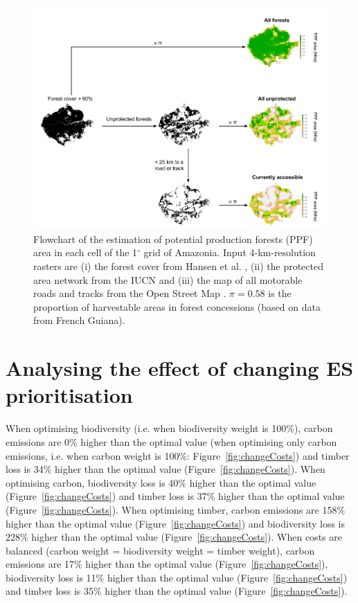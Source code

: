 \documentclass{article}
\begin{document}
\begin{figure}
    \centering
    \includegraphics[width=\linewidth]{graphs/PPFareaDiagram.pdf}
    \caption{Flowchart of the estimation of potential production forests (PPF) area in each cell of the 1$^{\circ}$ grid of Amazonia. Input 4-km-resolution rasters are (i) the forest cover from Hansen et al. \cite{Hansen2013}, (ii) the protected area network from the IUCN \cite{WDPA2016} and (iii) the map of all motorable roads and tracks from the Open Street Map \cite{OSM2018}. $\pi = 0.58$ is the proportion of harvestable areas in forest concessions (based on data from French Guiana). }
    \label{fig:ppfDiagram}
\end{figure}

\clearpage

\section{Analysing the effect of changing ES prioritisation}
\label{supsec:changeCost}

When optimising biodiversity (i.e. when biodiversity weight is 100\%), carbon emissions are 0\% higher than the optimal value (when optimising only carbon emissions, i.e. when carbon weight is 100\%: Figure~\ref{fig:changeCosts}) and timber loss is 34\% higher than the optimal value (Figure~\ref{fig:changeCosts}). When optimising carbon, biodiversity loss is 40\% higher than the optimal value (Figure~\ref{fig:changeCosts}) and timber loss is 37\% higher than the optimal value (Figure~\ref{fig:changeCosts}). When optimising timber, carbon emissions are 158\% higher than the optimal value (Figure~\ref{fig:changeCosts}) and biodiversity loss is 228\% higher than the optimal value (Figure~\ref{fig:changeCosts}).  When costs are balanced (carbon weight = biodiversity weight = timber weight), carbon emissions are 17\% higher than the optimal value (Figure~\ref{fig:changeCosts}), biodiversity loss is 11\% higher than the optimal value (Figure~\ref{fig:changeCosts}) and timber loss is 35\% higher than the optimal value (Figure~\ref{fig:changeCosts}). 
\end{document}
